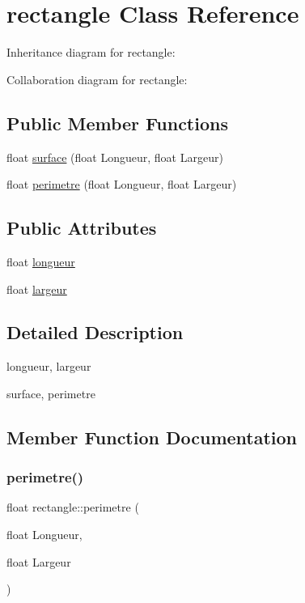 \hypertarget{classrectangle}{}\section{rectangle Class Reference}
\label{classrectangle}


Inheritance diagram for rectangle\+:


Collaboration diagram for rectangle\+:
\subsection*{Public Member Functions}
\begin{DoxyCompactItemize}
\item 
float \hyperlink{classrectangle_a6625a89c81749e339538ca4c0ea0ed0c}{surface} (float Longueur, float Largeur)
\item 
float \hyperlink{classrectangle_ad1a5cc6f25a7092241363311fba1b446}{perimetre} (float Longueur, float Largeur)
\end{DoxyCompactItemize}
\subsection*{Public Attributes}
\begin{DoxyCompactItemize}
\item 
float \hyperlink{classrectangle_a323614223c090cf3701e0877ff552328}{longueur}
\item 
float \hyperlink{classrectangle_afcdec92029cdbf85d33d8e11f389b37e}{largeur}
\end{DoxyCompactItemize}


\subsection{Detailed Description}
longueur, largeur

surface, perimetre 

\subsection{Member Function Documentation}
\mbox{\label{classrectangle_ad1a5cc6f25a7092241363311fba1b446}} 
\subsubsection{\texorpdfstring{perimetre()}{perimetre()}}
{\footnotesize\ttfamily float rectangle\+::perimetre (\begin{DoxyParamCaption}\item[{float}]{Longueur,  }\item[{float}]{Largeur }\end{DoxyParamCaption})}

